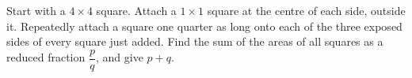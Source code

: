 Start with a $ 4\times4 $ square. Attach a $ 1\times1 $ square at the centre of each side, outside it. Repeatedly attach a square one quarter as long onto each of the three exposed sides of every square just added. Find the sum of the areas of all squares as a reduced fraction $\dfrac{p}{q}$, and give $ p+q $.
